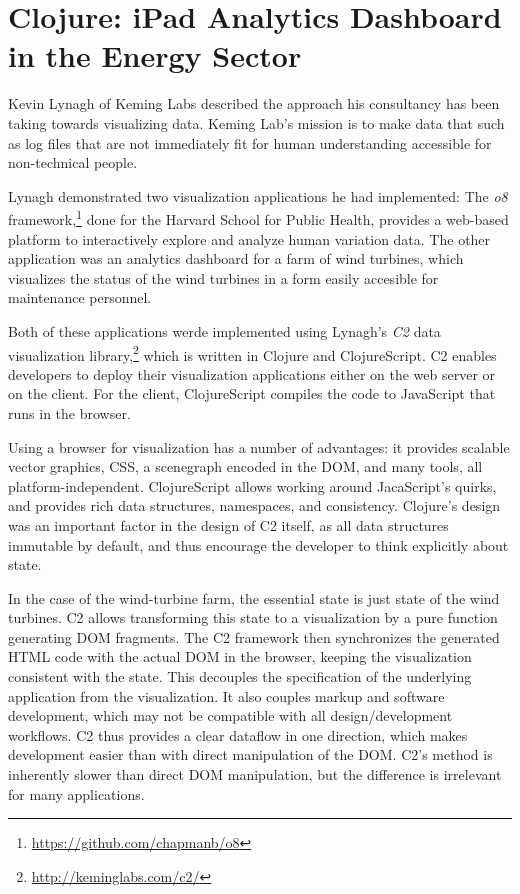 \documentclass{jfp1}
\begin{document}
\section{Clojure: iPad Analytics Dashboard in the Energy Sector}

Kevin Lynagh of Keming Labs described the approach his consultancy has
been taking towards visualizing data.  Keming Lab's mission is to make
data that such as log files that are not immediately fit for human
understanding accessible for non-technical people.  

Lynagh demonstrated two visualization applications he had implemented:
The \textit{o8}
framework,\footnote{\url{https://github.com/chapmanb/o8}} done for the
Harvard School for Public Health, provides a web-based platform to
interactively explore and analyze human variation data.  The other
application was an analytics dashboard for a farm of wind turbines,
which visualizes the status of the wind turbines in a form easily
accesible for maintenance personnel.

Both of these applications werde implemented using Lynagh's
\textit{C2} data visualization
library,\footnote{\url{http://keminglabs.com/c2/}} which is written in
Clojure and ClojureScript.  C2 enables developers to deploy their
visualization applications either on the web server or on the client.
For the client, ClojureScript compiles the code to JavaScript that
runs in the browser.

Using a browser for visualization has a number of advantages: it
provides scalable vector graphics, CSS, a scenegraph encoded in the
DOM, and many tools, all platform-independent.  ClojureScript allows
working around JacaScript's quirks, and provides rich data structures,
namespaces, and consistency.  Clojure's design was an important factor
in the design of C2 itself, as all data structures immutable by
default, and thus encourage the developer to think explicitly about
state.

In the case of the wind-turbine farm, the essential state is just
state of the wind turbines.  C2 allows transforming this state to a
visualization by a pure function generating DOM fragments.  The C2
framework then synchronizes the generated HTML code with the actual
DOM in the browser, keeping the visualization consistent with the
state.  This decouples the specification of the underlying application
from the visualization.  It also couples markup and software
development, which may not be compatible with all design/development
workflows.  C2 thus provides a clear dataflow in one direction, which
makes development easier than with direct manipulation of the DOM.
C2's method is inherently slower than direct DOM manipulation, but the
difference is irrelevant for many applications.
\end{document}
